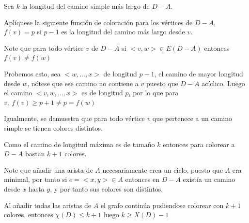 \documentclass[a4paper,1pt]{report}
\begin{document}
Sea $k$ la longitud del camino simple más largo de $D-A$.

Aplíquese la siguiente función de coloración  para los vértices de $D-A$, $f(v)=p$ si $p-1$ es la longitud del camino más largo desde $v$.

Note que para todo vértice $v$ de $D-A$ si $<v,w>\in E(D-A)$ entonces $f(v)\neq f(w)$

Probemos esto, sea $<w,\dots,x>$ de longitud $p-1$, el camino de mayor longitud  desde $w$, n\'otese que ese camino no contiene a $v$ puesto que $D-A$ ac\'iclico.
Luego el camino $<v,w,\dots,x>$ es de longitud $p$, por lo que para $v, \ f(v) \geq p + 1 \neq p = f(w)$ 


Igualmente, se demuestra que para todo vértice $v$ que pertenece a un camino simple se tienen colores distintos.

Como el camino de longitud máxima es de tamaño $k$ entonces para colorear a  $D-A$ bastan $k+1$ colores.

Note que añadir una arista de $A$ necesariamente crea un ciclo, puesto que $A$ era minimal, por tanto si $e=<x,y> \in A$ entonces en $D-A$ existía un camino desde $x$ hasta  $y$, y por tanto sus colores son distintos.

Al añadir todas las aristas de $A$ el grafo continúa pudiendose colorear con $k+1$ colores, entonces $\chi(D)\leq k+1$  luego $k\geq X(D)-1$
  
\end{document}
